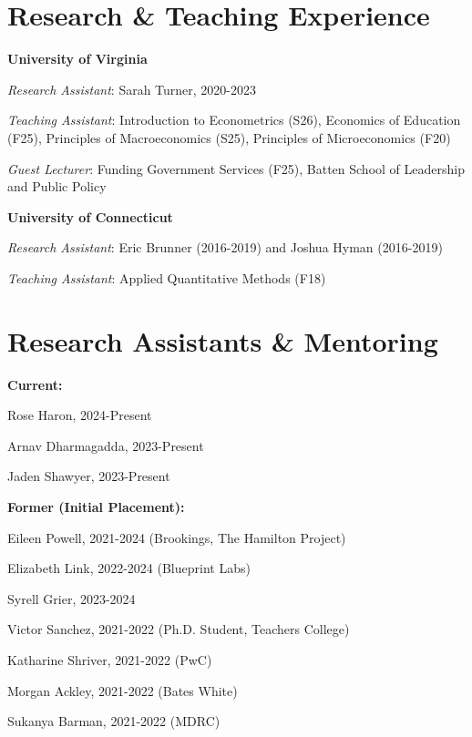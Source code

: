 \documentclass[letterpaper, 11pt]{article}
\renewenvironment{itemize}{
  \begin{list}{}
    { \setlength{\itemsep}{1.2pt} %
      \setlength{\parsep}{0pt}
      \setlength{\topsep}{0pt}
      \setlength{\leftmargin}{0em} } }{
  \end{list}}
\begin{document}
\section*{Research \& Teaching Experience}
\begin{itemize}
\item \textbf{University of Virginia}
    \begin{itemize}
    \item \textit{Research Assistant}: Sarah Turner, 2020-2023
    \item \textit{Teaching Assistant}: Introduction to Econometrics (S26), Economics of Education (F25), Principles of Macroeconomics (S25), Principles of Microeconomics (F20)
    \item \textit{Guest Lecturer}: Funding Government Services (F25), Batten School of Leadership and Public Policy
    \end{itemize}
\item \textbf{University of Connecticut}
    \begin{itemize}
    \item \textit{Research Assistant}: Eric Brunner (2016-2019) and Joshua Hyman (2016-2019)
    \item \textit{Teaching Assistant}: Applied Quantitative Methods (F18)
    \end{itemize}
\end{itemize}

\section*{Research Assistants \& Mentoring}

\textbf{Current:}
\begin{itemize}
\item Rose Haron, 2024-Present
\item Arnav Dharmagadda, 2023-Present 
\item Jaden Shawyer, 2023-Present
\end{itemize}

\textbf{Former (Initial Placement):}
\begin{itemize}
\item Eileen Powell, 2021-2024 (Brookings, The Hamilton Project)
\item Elizabeth Link, 2022-2024 (Blueprint Labs)
\item Syrell Grier, 2023-2024
\item Victor Sanchez, 2021-2022 (Ph.D. Student, Teachers College)
\item Katharine Shriver, 2021-2022 (PwC)
\item Morgan Ackley, 2021-2022 (Bates White)
\item Sukanya Barman, 2021-2022 (MDRC)
\end{itemize}
\end{document}
